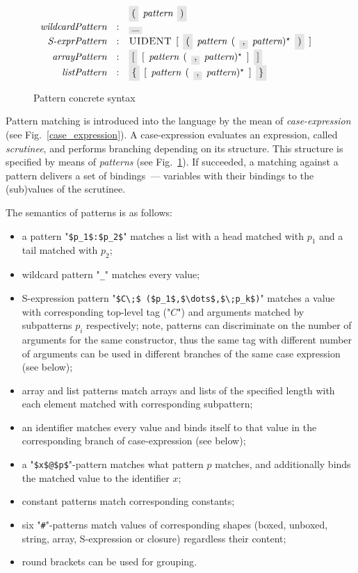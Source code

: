 \begin{figure}[t]
\[\begin{array}{rcll}
                                &   & \term{(}\s\nonterm{pattern}\s\term{)} & \\
      \defterm{wildcardPattern} & : & \term{\_} &\\
      \defterm{S-exprPattern}   & : & \token{UIDENT}\s[\s\term{(}\s\nonterm{pattern}\s(\s\term{,}\s\nonterm{pattern})^\star\s\term{)}\s] &\\
      \defterm{arrayPattern}    & : & \term{[}\s[\s\nonterm{pattern}\s(\s\term{,}\s\nonterm{pattern})^\star\s]\s\term{]} &\\
      \defterm{listPattern}     & : & \term{\{}\s[\s\nonterm{pattern}\s(\s\term{,}\s\nonterm{pattern})^\star\s]\s\term{\}} &
    \end{array}
  \]
  \caption{Pattern concrete syntax}
  \label{pattern}
\end{figure}

Pattern matching is introduced into the language by the mean of \emph{case-expression} (see Fig.~\ref{case_expression}). A case-expression
evaluates an expression, called \emph{scrutinee}, and performs branching depending on its structure. This structure is specified by
means of \emph{patterns} (see Fig.~\ref{pattern}). If succeeded, a matching against a pattern delivers a
set of bindings~--- variables with their bindings to the (sub)values of the scrutinee.

The semantics of patterns is as follows:

\begin{itemize}
\item a pattern "\lstinline|$p_1$:$p_2$|" matches a list with a head matched with $p_1$ and a tail matched with $p_2$;
\item wildcard pattern "\lstinline|_|" matches every value;
\item S-expression pattern "\lstinline|$C\;$ ($p_1$,$\dots$,$\;p_k$)|" matches a value with corresponding top-level
  tag ("$C$") and arguments matched by subpatterns $p_i$ respectively; note, patterns can discriminate on the
  number of arguments for the same constructor, thus the same tag with different number of arguments can be
  used in different branches of the same case expression (see below);
\item array and list patterns match arrays and lists of the specified length with each element matched with
  corresponding subpattern;
\item an identifier matches every value and binds itself to that value in the corresponding branch of
  case-expression (see below);
\item a "\lstinline|$x$@$p$|"-pattern matches what pattern $p$ matches, and additionally binds the
  matched value to the identifier $x$;
\item constant patterns match corresponding constants;
\item six "\lstinline|#|"-patterns match values of corresponding shapes (boxed, unboxed, string, array, S-expression or
  closure) regardless their content;
  \item round brackets can be used for grouping.
\end{itemize}

